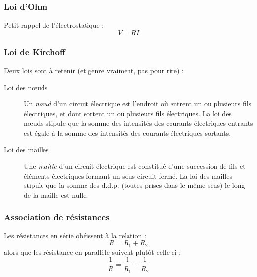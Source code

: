 \documentclass	[11pt, a4paper, openany]{book}
\begin{document}
		\subsubsection*{Loi d'Ohm}
		Petit rappel de l'électrostatique :
		\begin{equation}
			V = RI
		\end{equation}
		
		\subsubsection*{Loi de Kirchoff}
		Deux lois sont à retenir (et genre vraiment, pas pour rire) : 
		\begin{description}
			\item[Loi des nœuds] Un \textit{nœud} d'un circuit électrique est l'endroit où entrent un ou plusieurs fils électriques, et dont sortent un ou plusieurs fils électriques. La loi des nœuds stipule que la somme des intensités des courants électriques entrants est égale à la somme des intensités des courants électriques sortants.
			\item[Loi des mailles] Une \textit{maille} d'un circuit électrique est constitué d'une succession de fils et éléments électriques formant un sous-circuit fermé. La loi des mailles stipule que la somme des d.d.p. (toutes prises dans le même sens) le long de la maille est nulle.
		\end{description}
		
		
		\subsubsection*{Association de résistances}
		Les résistances en série obéissent à la relation :
		\begin{equation}
			R = R_1 + R_2
		\end{equation}
		alors que les résistance en parallèle suivent plutôt celle-ci :
		\begin{equation}
			\frac{1}{R} = \frac{1}{R_1} + \frac{1}{R_2}
		\end{equation}
		
\end{document}
